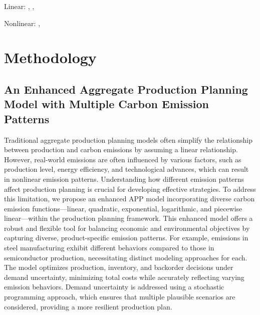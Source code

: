 \documentclass[final,3p,times,review,authoryear]{elsarticle}
\begin{document}
Linear: \citet{blanco2021}, \citet{Zhang2016} , \citet {Song2017} 

Nonlinear: \citet{Kumawat2021}, \citet{Meng2023} 
\cite{kunsch2008}
\cite{cachon2014}
\cite{gaigne2020}
\cite{do2021}
\cite{jabbour2018}
\cite{heydari2020}
\cite{cariou2019}
\cite{altendorfer2016}
\cite{zheng2016}
\cite{wang2023}
\cite{chen2014}
\cite{fahimnia2015}
\citep{jabbour2020}





\section{Methodology}

\subsection{An Enhanced Aggregate Production Planning Model with Multiple Carbon Emission Patterns}
Traditional aggregate production planning models often simplify the relationship between production and carbon emissions by assuming a linear relationship. However, real-world emissions are often influenced by various factors, such as production level, energy efficiency, and technological advances, which can result in nonlinear emission patterns. Understanding how different emission patterns affect production planning is crucial for developing effective strategies. To address this limitation, we propose an enhanced APP model incorporating diverse carbon emission functions—linear, quadratic, exponential, logarithmic, and piecewise linear—within the production planning framework. This enhanced model offers a robust and flexible tool for balancing economic and environmental objectives by capturing diverse, product-specific emission patterns. For example, emissions in steel manufacturing exhibit different behaviors compared to those in semiconductor production, necessitating distinct modeling approaches for each.  The model optimizes production, inventory, and backorder decisions under demand uncertainty, minimizing total costs while accurately reflecting varying emission behaviors. Demand uncertainty is addressed using a stochastic programming approach, which ensures that multiple plausible scenarios are considered, providing a more resilient production plan.
\end{document}
